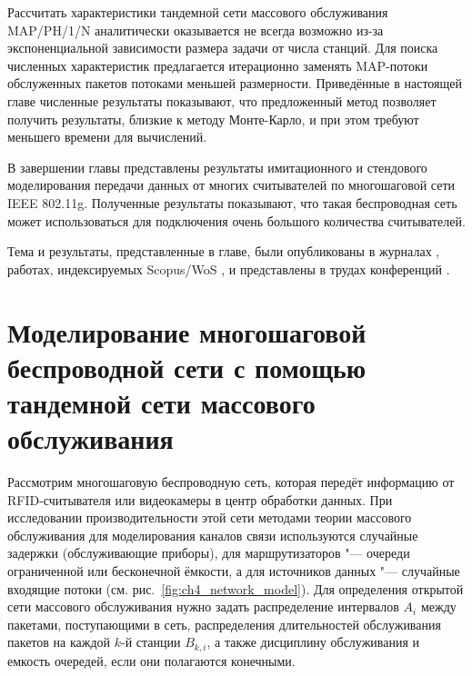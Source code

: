 Рассчитать характеристики тандемной сети массового обслуживания MAP/PH/1/N аналитически оказывается не всегда возможно из-за экспоненциальной зависимости размера задачи от числа станций. Для поиска численных характеристик предлагается итерационно заменять MAP-потоки обслуженных пакетов потоками меньшей размерности. Приведённые в настоящей главе численные результаты показывают, что предложенный метод позволяет получить результаты, близкие к методу Монте-Карло, и при этом требуют меньшего времени для вычислений.

В завершении главы представлены результаты имитационного и стендового моделирования передачи данных от многих считывателей по многошаговой сети IEEE 802.11g. Полученные результаты показывают, что такая беспроводная сеть может использоваться для подключения очень большого количества считывателей.

Тема и результаты, представленные в главе, были опубликованы в журналах \cite{WINET_IJPAM2016, WINET_TCOMM2015, QS_JITCS2013, QS_JPU2013, QS_TCOMM2012}, работах, индексируемых Scopus/WoS \cite{QS_ICAAPSP2020, QS_ITMM2019, QS_ITMM2017, QS_AICT2017, QS_ITMM2016, QS_DCCN2016_CCIS}, и представлены в трудах конференций \cite{WINET_DCCN2018, QS_ITTMM2015, QS_DCCN2015}.






\section{Моделирование многошаговой беспроводной сети с помощью тандемной сети массового обслуживания}\label{sec:ch4_wireless_network_model}

Рассмотрим многошаговую беспроводную сеть, которая передёт информацию от RFID-считывателя или видеокамеры в центр обработки данных. При исследовании производительности этой сети методами теории массового обслуживания для моделирования каналов связи используются случайные задержки (обслуживающие приборы), для маршрутизаторов "--- очереди ограниченной или бесконечной ёмкости, а для источников данных "--- случайные входящие потоки (см. рис.~\ref{fig:ch4_network_model}). Для определения открытой сети массового обслуживания нужно задать распределение интервалов $A_i$ между пакетами, поступающими в сеть, распределения длительностей обслуживания пакетов на каждой $k$-й станции $B_{k,i}$, а также дисциплину обслуживания и емкость очередей, если они полагаются конечными.

